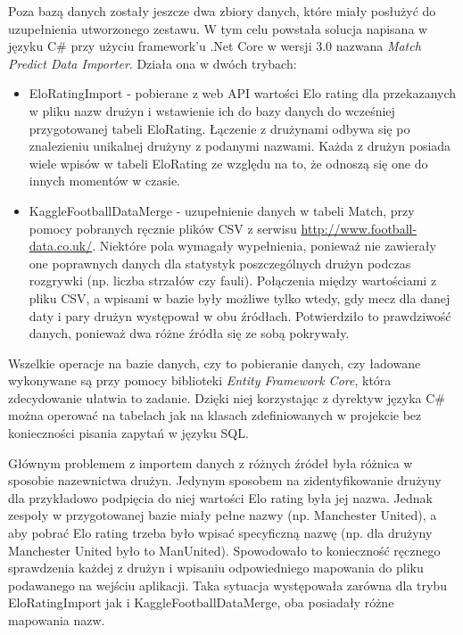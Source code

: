         Poza bazą danych zostały jeszcze dwa zbiory danych, które miały posłużyć do uzupełnienia utworzonego zestawu. W tym celu powstała solucja napisana w języku C\# przy użyciu framework'u  .Net Core w wersji 3.0 nazwana \textit{Match Predict Data Importer}. Działa ona w dwóch trybach:
        \begin{itemize}
            \item EloRatingImport - pobierane z web API wartości Elo rating dla przekazanych w pliku nazw drużyn i wstawienie ich do bazy danych do wcześniej przygotowanej tabeli EloRating. Łączenie z drużynami odbywa się po znalezieniu unikalnej drużyny z podanymi nazwami. Każda z drużyn posiada wiele wpisów w tabeli EloRating ze względu na to, że odnoszą się one do innych momentów w czasie. 
            \item KaggleFootballDataMerge - uzupełnienie danych w tabeli Match, przy pomocy pobranych ręcznie plików CSV z serwisu \url{http://www.football-data.co.uk/}. Niektóre pola wymagały wypełnienia, ponieważ nie zawierały one poprawnych danych dla statystyk poszczególnych drużyn podczas rozgrywki (np. liczba strzałów czy fauli). Połączenia między wartościami z pliku CSV, a wpisami w bazie były możliwe tylko wtedy, gdy mecz dla danej daty i pary drużyn występował w obu źródłach. Potwierdziło to prawdziwość danych, ponieważ dwa różne źródła się ze sobą pokrywały.
        \end{itemize}
        
        Wszelkie operacje na bazie danych, czy to pobieranie danych, czy ładowane wykonywane są przy pomocy biblioteki \textit{Entity Framework Core}, która zdecydowanie ułatwia to zadanie. Dzięki niej korzystając z dyrektyw języka C\# można operować na tabelach jak na klasach zdefiniowanych w projekcie bez konieczności pisania zapytań w języku SQL.
        
        Głównym problemem z importem danych z różnych źródeł była różnica w sposobie nazewnictwa drużyn. Jedynym sposobem na zidentyfikowanie drużyny dla przykładowo podpięcia do niej wartości Elo rating była jej nazwa. Jednak zespoły w przygotowanej bazie miały pełne nazwy (np. Manchester United), a aby pobrać Elo rating trzeba było wpisać specyficzną nazwę (np. dla drużyny Manchester United było to ManUnited). Spowodowało to konieczność ręcznego sprawdzenia każdej z drużyn i wpisaniu odpowiedniego mapowania do pliku podawanego na wejściu aplikacji. Taka sytuacja występowała zarówna dla trybu EloRatingImport jak i KaggleFootballDataMerge, oba posiadały różne mapowania nazw.
        
